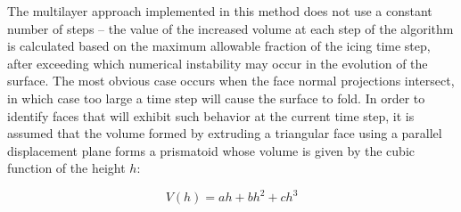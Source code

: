 \documentclass[
11pt,%
tightenlines,%
twoside,%
onecolumn,%
nofloats,%
nobibnotes,%
nofootinbib,%
superscriptaddress,%
noshowpacs,%
centertags]%
{revtex4}
\begin{document}
The multilayer approach implemented in this method does not use a constant number of steps -- the value of the increased volume at each step of the algorithm is calculated based on the maximum allowable fraction of the icing time step, after exceeding which numerical instability may occur in the evolution of the surface.
The most obvious case occurs when the face normal projections intersect, in which case too large a time step will cause the surface to fold.
In order to identify faces that will exhibit such behavior at the current time step, it is assumed that the volume formed by extruding a triangular face using a parallel displacement plane forms a prismatoid whose volume is given by the cubic function of the height $h$:

\begin{equation}\label{Tong:1}
V(h)=ah+bh^2+ch^3
\end{equation}
\end{document}
